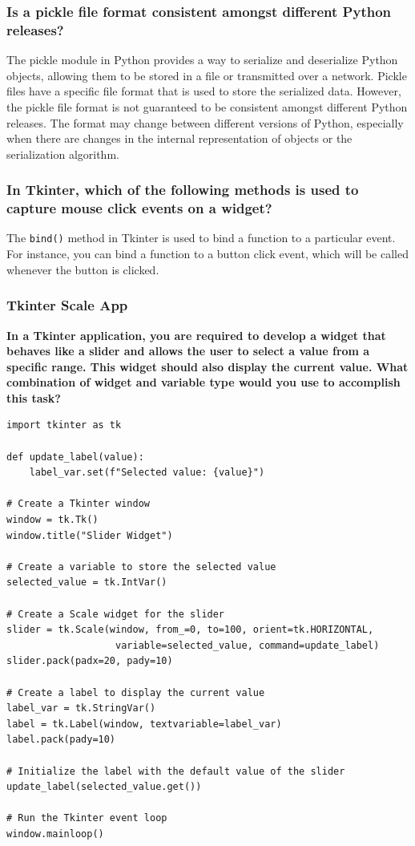 \subsubsection{Is a pickle file format consistent amongst different Python releases?}

The pickle module in Python provides a way to serialize and deserialize Python objects, allowing them to be stored in a file or transmitted over a network. Pickle files have a specific file format that is used to store the serialized data. However, the pickle file format is not guaranteed to be consistent amongst different Python releases. The format may change between different versions of Python, especially when there are changes in the internal representation of objects or the serialization algorithm.

\newpage
\subsubsection{In Tkinter, which of the following methods is used to capture mouse click events on a widget?}

The \texttt{bind()} method in Tkinter is used to bind a function to a particular event. For instance, you can bind a function to a button click event, which will be called whenever the button is clicked.

\subsubsection{Tkinter Scale App}
\textbf{In a Tkinter application, you are required to develop a widget that behaves like a slider and allows the user to select a value from a specific range. This widget should also display the current value. What combination of widget and variable type would you use to accomplish this task?}

\begin{codebox}
\begin{verbatim}
import tkinter as tk

def update_label(value):
    label_var.set(f"Selected value: {value}")

# Create a Tkinter window
window = tk.Tk()
window.title("Slider Widget")

# Create a variable to store the selected value
selected_value = tk.IntVar()

# Create a Scale widget for the slider
slider = tk.Scale(window, from_=0, to=100, orient=tk.HORIZONTAL,
                   variable=selected_value, command=update_label)
slider.pack(padx=20, pady=10)

# Create a label to display the current value
label_var = tk.StringVar()
label = tk.Label(window, textvariable=label_var)
label.pack(pady=10)

# Initialize the label with the default value of the slider
update_label(selected_value.get())

# Run the Tkinter event loop
window.mainloop()
\end{verbatim}
\end{codebox}

